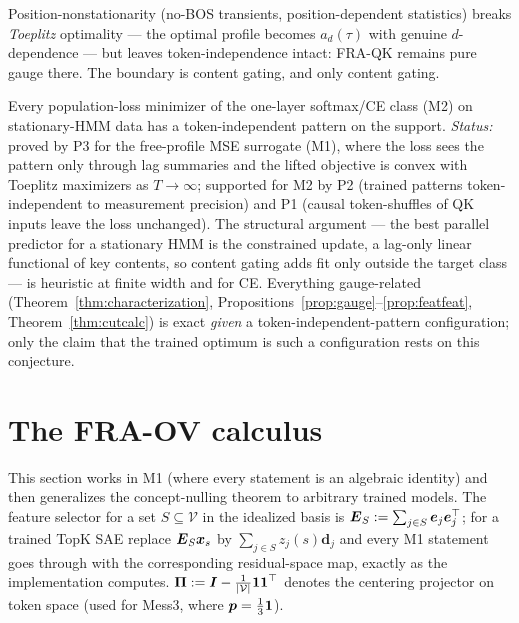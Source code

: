 \documentclass{article}
\begin{document}
\begin{remark}
Position-nonstationarity (no-BOS transients, position-dependent statistics) breaks \emph{Toeplitz} optimality --- the optimal profile becomes $a_d(\tau)$ with genuine $d$-dependence --- but leaves token-independence intact: FRA-QK remains pure gauge there. The boundary is content gating, and only content gating.
\end{remark}

\begin{conjecture}\label{conj:z1}
Every population-loss minimizer of the one-layer softmax/CE class (M2) on stationary-HMM data has a token-independent pattern on the support. \emph{Status:} proved by P3 for the free-profile MSE surrogate (M1), where the loss sees the pattern only through lag summaries and the lifted objective is convex with Toeplitz maximizers as $T \to \infty$; supported for M2 by P2 (trained patterns token-independent to measurement precision) and P1 (causal token-shuffles of QK inputs leave the loss unchanged). The structural argument --- the best parallel predictor for a stationary HMM is the constrained update, a lag-only linear functional of key contents, so content gating adds fit only outside the target class --- is heuristic at finite width and for CE. Everything gauge-related (Theorem~\ref{thm:characterization}, Propositions~\ref{prop:gauge}--\ref{prop:featfeat}, Theorem~\ref{thm:cutcalc}) is exact \emph{given} a token-independent-pattern configuration; only the claim that the trained optimum is such a configuration rests on this conjecture.
\end{conjecture}

\section{The FRA-OV calculus}\label{sec:ov}

This section works in M1 (where every statement is an algebraic identity) and then generalizes the concept-nulling theorem to arbitrary trained models. The feature selector for a set $S \subseteq \mathcal{V}$ in the idealized basis is $\boldsymbol{E}_S := \sum_{j\in S}\boldsymbol{e}_j\boldsymbol{e}_j^\top$; for a trained TopK SAE replace $\boldsymbol{E}_S\boldsymbol{x}_s$ by $\sum_{j\in S} z_j(s)\boldsymbol{d}_j$ and every M1 statement goes through with the corresponding residual-space map, exactly as the implementation computes. $\boldsymbol{\Pi} := \boldsymbol{I} - \tfrac1{{\vert \mathcal{V}\vert}}\boldsymbol{1}\boldsymbol{1}^\top$ denotes the centering projector on token space (used for Mess3, where $\boldsymbol{p} = \tfrac13\boldsymbol{1}$).
\end{document}
